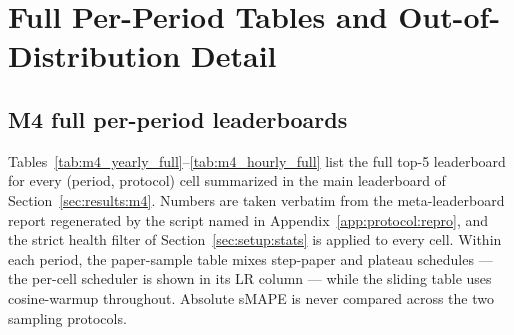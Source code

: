 %
%
%

\section{Full Per-Period Tables and Out-of-Distribution Detail}
\label{app:fulltables}

\subsection{M4 full per-period leaderboards}
\label{app:fulltables:m4}

Tables~\ref{tab:m4_yearly_full}--\ref{tab:m4_hourly_full} list the full
top-5 leaderboard for every (period, protocol) cell summarized in the main
leaderboard of Section~\ref{sec:results:m4}. Numbers are taken verbatim
from the meta-leaderboard report regenerated by the script named in
Appendix~\ref{app:protocol:repro}, and the strict health filter of
Section~\ref{sec:setup:stats} is applied to every cell. Within each period,
the paper-sample table mixes step-paper and plateau schedules --- the
per-cell scheduler is shown in its LR column --- while the sliding table
uses cosine-warmup throughout. Absolute sMAPE is never compared across the
two sampling protocols.


